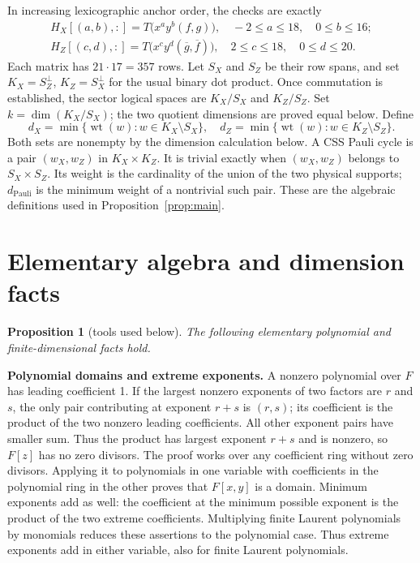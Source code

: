 \documentclass{article}
\newtheorem{proposition}{Proposition}
\DeclareMathOperator{\wt}{wt}
\begin{document}
In increasing lexicographic anchor order, the checks are exactly
\begin{gather}
  H_X[(a,b), {:}] = T\bigl(x^a y^b (f, g)\bigr),
  \quad -2 \le a \le 18, \quad 0 \le b \le 16; \\
  H_Z[(c,d), {:}] = T\bigl(x^c y^d (\overline{g}, \overline{f})\bigr),
  \quad 2 \le c \le 18, \quad 0 \le d \le 20.
\end{gather}
Each matrix has \(21 \cdot 17 = 357\) rows. Let \(S_X\) and \(S_Z\) be their row spans, and
set \(K_X = S_Z^{\perp}\), \(K_Z = S_X^{\perp}\) for the usual binary dot product. Once
commutation is established, the sector logical spaces are \(K_X/S_X\) and \(K_Z/S_Z\). Set
\(k = \dim(K_X/S_X)\); the two quotient dimensions are proved equal below. Define
\begin{equation}
  d_X = \min\{\wt(w) : w \in K_X \setminus S_X\}, \quad
  d_Z = \min\{\wt(w) : w \in K_Z \setminus S_Z\}.
\end{equation}
Both sets are nonempty by the dimension calculation below. A CSS Pauli cycle is a pair
\((w_X, w_Z)\) in \(K_X \times K_Z\). It is trivial exactly when \((w_X, w_Z)\) belongs to
\(S_X \times S_Z\). Its weight is the cardinality of the union of the two physical supports;
\(d_{\text{Pauli}}\) is the minimum weight of a nontrivial such pair. These are the algebraic
definitions used in Proposition~\ref{prop:main}.

\section{Elementary algebra and dimension facts}\label{sec:tools}

\begin{proposition}[tools used below]\label{prop:tools}
  The following elementary polynomial and finite-dimensional facts hold.
\end{proposition}

\textbf{Polynomial domains and extreme exponents.} A nonzero polynomial over \(F\) has
leading coefficient 1. If the largest nonzero exponents of two factors are \(r\) and \(s\),
the only pair contributing at exponent \(r + s\) is \((r, s)\); its coefficient is the
product of the two nonzero leading coefficients. All other exponent pairs have smaller sum.
Thus the product has largest exponent \(r + s\) and is nonzero, so \(F[z]\) has no zero
divisors. The proof works over any coefficient ring without zero divisors. Applying it to
polynomials in one variable with coefficients in the polynomial ring in the other proves that
\(F[x,y]\) is a domain. Minimum exponents add as well: the coefficient at the minimum possible
exponent is the product of the two extreme coefficients. Multiplying finite Laurent
polynomials by monomials reduces these assertions to the polynomial case. Thus extreme
exponents add in either variable, also for finite Laurent polynomials.
\end{document}
